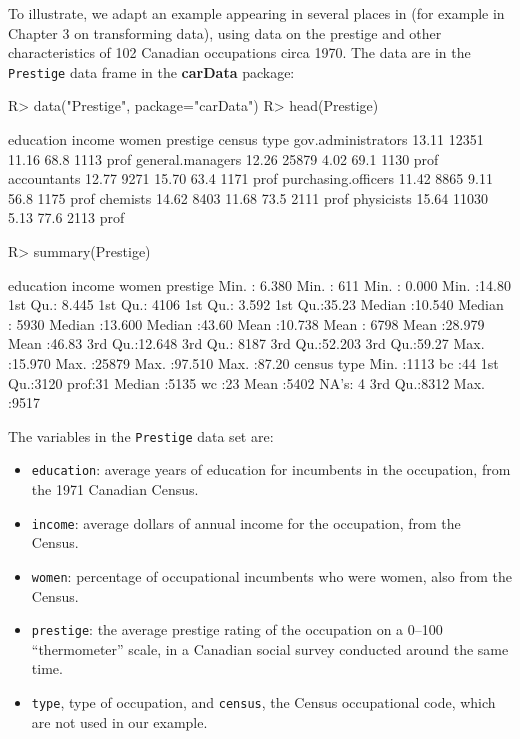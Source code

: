 \documentclass[
]{jss}
\providecommand{\tightlist}{%
  \setlength{\itemsep}{0pt}\setlength{\parskip}{0pt}}
\begin{document}
To illustrate, we adapt an example appearing in several places in
\citet{FoxWeisberg:2019} (for example in Chapter 3 on transforming
data), using data on the prestige and other characteristics of 102
Canadian occupations circa 1970. The data are in the \texttt{Prestige}
data frame in the \textbf{carData} package:

\begin{CodeChunk}
\begin{CodeInput}
R> data("Prestige", package="carData")
R> head(Prestige)
\end{CodeInput}
\begin{CodeOutput}
                    education income women prestige census type
gov.administrators      13.11  12351 11.16     68.8   1113 prof
general.managers        12.26  25879  4.02     69.1   1130 prof
accountants             12.77   9271 15.70     63.4   1171 prof
purchasing.officers     11.42   8865  9.11     56.8   1175 prof
chemists                14.62   8403 11.68     73.5   2111 prof
physicists              15.64  11030  5.13     77.6   2113 prof
\end{CodeOutput}
\begin{CodeInput}
R> summary(Prestige)
\end{CodeInput}
\begin{CodeOutput}
   education          income          women           prestige    
 Min.   : 6.380   Min.   :  611   Min.   : 0.000   Min.   :14.80  
 1st Qu.: 8.445   1st Qu.: 4106   1st Qu.: 3.592   1st Qu.:35.23  
 Median :10.540   Median : 5930   Median :13.600   Median :43.60  
 Mean   :10.738   Mean   : 6798   Mean   :28.979   Mean   :46.83  
 3rd Qu.:12.648   3rd Qu.: 8187   3rd Qu.:52.203   3rd Qu.:59.27  
 Max.   :15.970   Max.   :25879   Max.   :97.510   Max.   :87.20  
     census       type   
 Min.   :1113   bc  :44  
 1st Qu.:3120   prof:31  
 Median :5135   wc  :23  
 Mean   :5402   NA's: 4  
 3rd Qu.:8312            
 Max.   :9517            
\end{CodeOutput}
\end{CodeChunk}

The variables in the \texttt{Prestige} data set are:

\begin{itemize}
\tightlist
\item
  \texttt{education}: average years of education for incumbents in the
  occupation, from the 1971 Canadian Census.
\item
  \texttt{income}: average dollars of annual income for the occupation,
  from the Census.
\item
  \texttt{women}: percentage of occupational incumbents who were women,
  also from the Census.
\item
  \texttt{prestige}: the average prestige rating of the occupation on a
  0--100 ``thermometer'' scale, in a Canadian social survey conducted
  around the same time.
\item
  \texttt{type}, type of occupation, and \texttt{census}, the Census
  occupational code, which are not used in our example.
\end{itemize}
\end{document}
